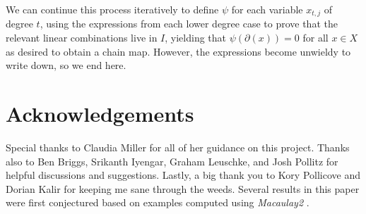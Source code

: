 \documentclass{amsart}
\theoremstyle{definition}
\theoremstyle{remark}
\begin{document}
We can continue this process iteratively to define $\psi $ for each variable $x_{t,j}$ of degree $t$, using the expressions from each lower degree case to prove that the relevant linear combinations live in $I$, yielding that $\psi(\partial(x))=0$ for all $x \in X$ as desired to obtain a chain map. However, the expressions become unwieldy to write down, so we end here.




\section{Acknowledgements}
Special thanks to Claudia Miller for all of her guidance on this project. Thanks also to Ben Briggs, Srikanth Iyengar, Graham Leuschke, and Josh Pollitz for helpful discussions and suggestions. Lastly, a big thank you to Kory Pollicove and Dorian Kalir for keeping me sane through the weeds. Several results in this paper were first conjectured based on examples computed using \textit{Macaulay2} \cite{M2}.

\nocite{*}
\printbibliography





\end{document}

